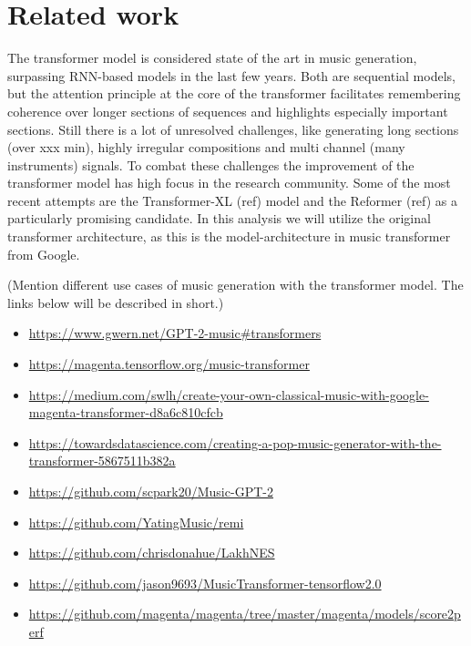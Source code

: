 \documentclass{article}
\begin{document}
    \section{Related work}
       The transformer model is considered state of the art in music generation,
       surpassing RNN-based models in the last few years. Both are sequential models,
       but the attention principle at the core of the transformer facilitates
       remembering coherence over longer sections of sequences and highlights
       especially important sections. Still there is a lot of unresolved challenges,
       like generating long sections (over xxx min), highly irregular compositions
       and multi channel (many instruments) signals. To combat these challenges the
       improvement of the transformer model has high focus in the research community.
       Some of the most recent attempts are the Transformer-XL (ref) model and the
       Reformer (ref) as a particularly promising candidate. In this analysis we
       will utilize the original transformer architecture, as this is the
       model-architecture in music transformer from Google.
        
        (Mention different use cases of music generation with the transformer model.
        The links below will be described in short.)
        
        \begin{itemize}
            \item \url{https://www.gwern.net/GPT-2-music#transformers}
            \item \url{https://magenta.tensorflow.org/music-transformer}
            \item \url{https://medium.com/swlh/create-your-own-classical-music-with-google-magenta-transformer-d8a6c810cfcb}
            \item \url{https://towardsdatascience.com/creating-a-pop-music-generator-with-the-transformer-5867511b382a}
            \item \url{https://github.com/scpark20/Music-GPT-2}
            \item \url{https://github.com/YatingMusic/remi}
            \item \url{https://github.com/chrisdonahue/LakhNES}
            \item \url{https://github.com/jason9693/MusicTransformer-tensorflow2.0}
            \item \url{https://github.com/magenta/magenta/tree/master/magenta/models/score2perf}
        \end{itemize}
\end{document}
